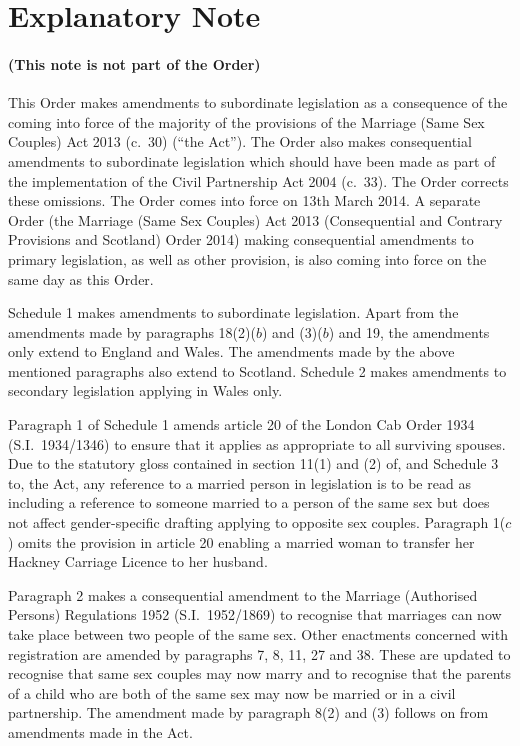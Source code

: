 \documentclass[12pt,a4paper]{article}
\begin{document}
\part{Explanatory Note}

\renewcommand\parthead{— Explanatory Note}

\subsection*{(This note is not part of the Order)}

This Order makes amendments to subordinate legislation as a consequence of the coming into force of the majority of the provisions of the Marriage (Same Sex Couples) Act 2013 (c.~30) (“the Act”). The Order also makes consequential amendments to subordinate legislation which should have been made as part of the implementation of the Civil Partnership Act 2004 (c.~33). The Order corrects these omissions. The Order comes into force on 13th March 2014. A separate Order (the Marriage (Same Sex Couples) Act 2013 (Consequential and Contrary Provisions and Scotland) Order 2014) making consequential amendments to primary legislation, as well as other provision, is also coming into force on the same day as this Order.

Schedule 1 makes amendments to subordinate legislation. Apart from the amendments made by paragraphs 18(2)($b$)  and (3)($b$)  and 19, the amendments only extend to England and Wales. The amendments made by the above mentioned paragraphs also extend to Scotland. Schedule 2 makes amendments to secondary legislation applying in Wales only.

Paragraph 1 of Schedule 1 amends article 20 of the London Cab Order 1934 (S.I.~1934/1346) to ensure that it applies as appropriate to all surviving spouses. Due to the statutory gloss contained in section 11(1) and (2) of, and Schedule 3 to, the Act, any reference to a married person in legislation is to be read as including a reference to someone married to a person of the same sex but does not affect gender-specific drafting applying to opposite sex couples. Paragraph 1($c$)  omits the provision in article 20 enabling a married woman to transfer her Hackney Carriage Licence to her husband.

Paragraph 2 makes a consequential amendment to the Marriage (Authorised Persons) Regulations 1952 (S.I.~1952/1869) to recognise that marriages can now take place between two people of the same sex. Other enactments concerned with registration are amended by paragraphs 7, 8, 11, 27 and 38. These are updated to recognise that same sex couples may now marry and to recognise that the parents of a child who are both of the same sex may now be married or in a civil partnership. The amendment made by paragraph 8(2) and (3) follows on from amendments made in the Act.
\end{document}
